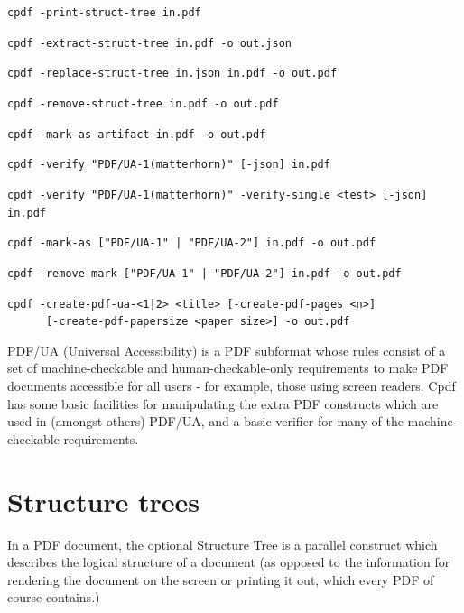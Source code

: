 \documentclass{book}
\begin{document}
  {\small\begin{framed}
  \noindent\verb!cpdf -print-struct-tree in.pdf!

  \vspace{1.5mm}
  \noindent\verb!cpdf -extract-struct-tree in.pdf -o out.json!

  \vspace{1.5mm}
  \noindent\verb!cpdf -replace-struct-tree in.json in.pdf -o out.pdf!

  \vspace{1.5mm}
  \noindent\verb!cpdf -remove-struct-tree in.pdf -o out.pdf!

  \vspace{1.5mm}
  \noindent\verb!cpdf -mark-as-artifact in.pdf -o out.pdf!

  \vspace{1.5mm}
  \noindent\verb!cpdf -verify "PDF/UA-1(matterhorn)" [-json] in.pdf!

  \vspace{1.5mm}
  \noindent\verb!cpdf -verify "PDF/UA-1(matterhorn)" -verify-single <test> [-json] in.pdf!

  \vspace{1.5mm}
  \noindent\verb!cpdf -mark-as ["PDF/UA-1" | "PDF/UA-2"] in.pdf -o out.pdf!

  \vspace{1.5mm}
  \noindent\verb!cpdf -remove-mark ["PDF/UA-1" | "PDF/UA-2"] in.pdf -o out.pdf!

  \vspace{1.5mm}
  \noindent\verb!cpdf -create-pdf-ua-<1|2> <title> [-create-pdf-pages <n>]!\\
  \noindent\verb!      [-create-pdf-papersize <paper size>] -o out.pdf!

  \end{framed}}

PDF/UA (Universal Accessibility) is a PDF subformat whose rules consist of a set of machine-checkable and human-checkable-only requirements to make PDF documents accessible for all users - for example, those using screen readers. Cpdf has some basic facilities for manipulating the extra PDF constructs which are used in (amongst others) PDF/UA, and a basic verifier for many of the machine-checkable requirements.

\section{Structure trees}

In a PDF document, the optional Structure Tree is a parallel construct which describes the logical structure of a document (as opposed to the information for rendering the document on the screen or printing it out, which every PDF of course contains.)
\end{document}
